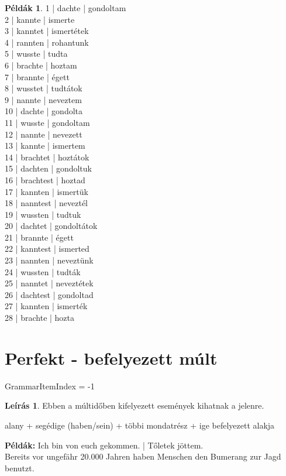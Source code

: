 \documentclass{article}
\theoremstyle{definition}
\newtheorem*{exmp}{Példák}
\newtheorem*{desc}{Leírás}
\begin{document}
\begin{exmp}	%
1 | dachte | gondoltam\\
2 | kannte | ismerte\\
3 | kanntet | ismertétek\\
4 | rannten | rohantunk\\
5 | wusste | tudta\\
6 | brachte | hoztam\\
7 | brannte | égett\\
8 | wusstet | tudtátok\\
9 | nannte | neveztem\\
10 | dachte | gondolta\\
11 | wusste | gondoltam\\
12 | nannte | nevezett\\
13 | kannte | ismertem\\
14 | brachtet | hoztátok\\
15 | dachten | gondoltuk\\
16 | brachtest | hoztad\\
17 | kannten | ismertük\\
18 | nanntest | neveztél\\
19 | wussten | tudtuk\\
20 | dachtet | gondoltátok\\
21 | brannte | égett\\
22 | kanntest | ismerted\\
23 | nannten | neveztünk\\
24 | wussten | tudták\\
25 | nanntet | neveztétek\\
26 | dachtest | gondoltad\\
27 | kannten | ismerték\\
28 | brachte | hozta\\
\end{exmp}

\section{Perfekt - befelyezett múlt}

GrammarItemIndex = -1

\begin{desc}
Ebben a múltidőben kifelyezett események kihatnak a jelenre.
\begin{center}
alany + segédige (haben/sein) + többi mondatrész + ige befelyezett alakja
\end{center}

\textbf{Példák:} Ich bin von euch gekommen. | Tőletek jöttem.\\
Bereits vor ungefähr 20.000 Jahren haben Menschen den Bumerang zur Jagd benutzt.
\end{desc}
\end{document}
